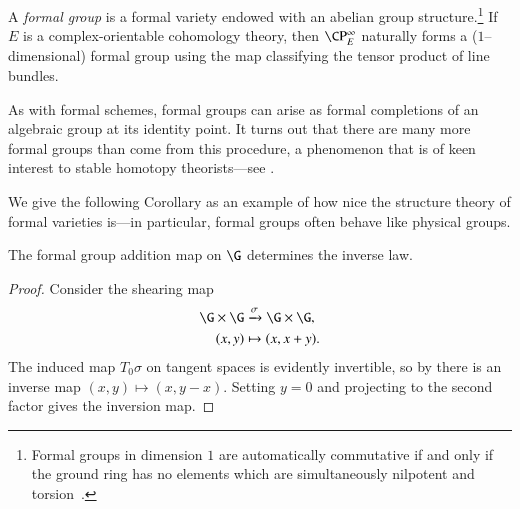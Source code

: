 \begin{definition}\label{DefnFormalGps}
A \textit{formal group} is a formal variety endowed with an abelian group structure.\footnote{Formal groups in dimension $1$ are automatically commutative if and only if the ground ring has no elements which are simultaneously nilpotent and torsion~\cite[Theorem I.6.1]{Hazewinkel}.}  If $E$ is a complex-orientable cohomology theory, then $\CP^\infty_E$ naturally forms a ($1$--dimensional) formal group using the map classifying the tensor product of line bundles.
\end{definition}

\begin{remark}
As with formal schemes, formal groups can arise as formal completions of an algebraic group at its identity point.  It turns out that there are many more formal groups than come from this procedure, a phenomenon that is of keen interest to stable homotopy theorists---see .
\end{remark}

We give the following Corollary as an example of how nice the structure theory of formal varieties is---in particular, formal groups often behave like physical groups.

\begin{corollary}
The formal group addition map on $\G$ determines the inverse law.
\end{corollary}
\begin{proof}
Consider the shearing map
\begin{align*}
\G \times \G & \xrightarrow{\sigma} \G \times \G, \\
(x, y) & \mapsto (x, x + y).
\end{align*}
The induced map $T_0 \sigma$ on tangent spaces is evidently invertible, so by  there is an inverse map $(x, y) \mapsto (x, y - x)$.  Setting $y = 0$ and projecting to the second factor gives the inversion map.
\end{proof}



